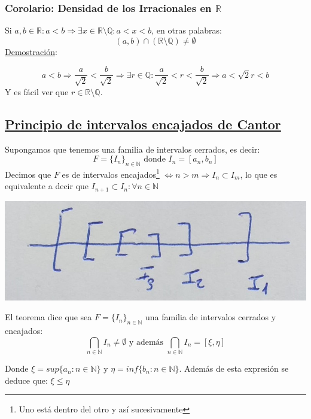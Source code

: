 \documentclass[10pt,a4paper,openright]{book}
\begin{document}
\subsubsection*{Corolario: Densidad de los Irracionales en $\mathbb R$}
Si $a,b\in \mathbb R: a<b\Rightarrow \exists x\in \mathbb R\mbox{\textbackslash} \mathbb Q: a<x<b$, en otras palabras:
$$(a,b)\cap (\mathbb R\mbox{\textbackslash} \mathbb Q)\neq \emptyset$$
\underline{Demostración}:\par
$$a<b\Rightarrow \frac{a}{\sqrt{2}}< \frac{b}{\sqrt{2}}\Rightarrow \exists r \in \mathbb Q: \frac{a}{\sqrt{2}}<r<\frac{b}{\sqrt{2}}\Rightarrow a <\sqrt{2}r<b$$
Y es fácil ver que $r\in \mathbb R\mbox{\textbackslash}\mathbb Q$.

\subsection*{\underline{Principio de intervalos encajados de Cantor}}
Supongamos que tenemos una familia de intervalos cerrados, es decir:
$$F=\{I_n\}_{n\in \mathbb N}\mbox{ donde }I_n=[a_n,b_n]$$
Decimos que $F$ es de intervalos encajados\footnote{Uno está dentro del otro y así sucesivamente} $\Leftrightarrow n >m \Rightarrow I_n\subset I_m$, lo que es equivalente a decir que $I_{n+1}\subset I_{n}: \forall n\in \mathbb N$\par

\begin{center}
\includegraphics[scale=0.20]{Intervalos encajados}
\end{center}

El teorema dice que sea $F=\{I_n\}_{n\in \mathbb N}$ una familia de intervalos cerrados y encajados:
$$\bigcap_{n\in \mathbb N}I_n\neq \emptyset \mbox{ y además }\bigcap_{n\in \mathbb N} I_n=[\xi, \eta]$$

Donde $\xi=sup\{a_n: n\in \mathbb N\}$ y $\eta=inf\{b_n: n\in \mathbb N\}$. Además de esta expresión se deduce que: $\xi\leq \eta$\par
\vspace{3cm}
\end{document}

